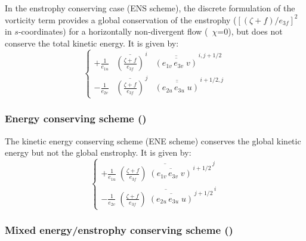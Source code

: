 \documentclass[../main/NEMO_manual]{subfiles}
\begin{document}
In the enstrophy conserving case (ENS scheme),
the discrete formulation of the vorticity term provides a global conservation of the enstrophy
($ [ (\zeta +f ) / e_{3f} ]^2 $ in $s$-coordinates) for a horizontally non-divergent flow (\ie\ $\chi$=$0$),
but does not conserve the total kinetic energy.
It is given by:
\begin{equation}
  \label{eq:DYN_vor_ens}
  \left\{
    \begin{aligned}
      {+\frac{1}{e_{1u} } } & {\overline {\left( { \frac{\zeta +f}{e_{3f} }} \right)} }^{\,i}
      & {\overline{\overline {\left( {e_{1v}\,e_{3v}\;v} \right)}} }^{\,i, j+1/2}    \\
      {- \frac{1}{e_{2v} } } & {\overline {\left( {\frac{\zeta +f}{e_{3f} }} \right)} }^{\,j}
      & {\overline{\overline {\left( {e_{2u}\,e_{3u}\;u} \right)}} }^{\,i+1/2, j}
    \end{aligned}
  \right.
\end{equation}

\subsubsection[Energy conserving scheme (\forcode{ln_dynvor_ene})]{Energy conserving scheme (\protect{})}
\label{subsec:DYN_vor_ene}

The kinetic energy conserving scheme (ENE scheme) conserves the global kinetic energy but not the global enstrophy.
It is given by:
\begin{equation}
  \label{eq:DYN_vor_ene}
  \left\{
    \begin{aligned}
      {+\frac{1}{e_{1u}}\; {\overline {\left( {\frac{\zeta +f}{e_{3f} }} \right)
            \;  \overline {\left( {e_{1v}\,e_{3v}\;v} \right)} ^{\,i+1/2}} }^{\,j} }    \\
      {- \frac{1}{e_{2v}}\; {\overline {\left( {\frac{\zeta +f}{e_{3f} }} \right)
            \;  \overline {\left( {e_{2u}\,e_{3u}\;u} \right)} ^{\,j+1/2}} }^{\,i} }
    \end{aligned}
  \right.
\end{equation}

\subsubsection[Mixed energy/enstrophy conserving scheme (\forcode{ln_dynvor_mix})]{Mixed energy/enstrophy conserving scheme (\protect{})}
\label{subsec:DYN_vor_mix}
\end{document}
